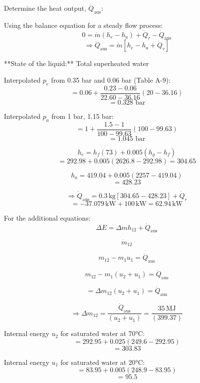Determine the heat output, $\dot{Q}_{\text{aus}}$:

Using the balance equation for a steady flow process:
\[
0 = \dot{m} (h_e - h_a) + \dot{Q}_r - \dot{Q}_{\text{aus}}
\]
\[
\Rightarrow \dot{Q}_{\text{aus}} = \dot{m} [h_e - h_a + \dot{Q}_r]
\]

**State of the liquid:** Total superheated water

Interpolated $p_e$ from 0.35 bar and 0.06 bar (Table A-9):
\[
= 0.06 + \frac{0.23 - 0.06}{22.60 - 36.16} (20 - 36.16)
\]
\[
= 0.328 \text{ bar}
\]

Interpolated $p_a$ from 1 bar, 1.15 bar:
\[
= 1 + \frac{1.5 - 1}{100 - 99.63} (100 - 99.63)
\]
\[
= 1.045 \text{ bar}
\]

\[
h_e = h_f (73) + 0.005 (h_{g} - h_{f})
\]
\[
= 292.98 + 0.005 (2626.8 - 292.98) = 304.65
\]

\[
h_a = 419.04 + 0.005 (2257 - 419.04)
\]
\[
= 428.23
\]

\[
\Rightarrow \dot{Q}_{\text{aus}} = 0.3 \, \text{kg} \left[ 304.65 - 428.23 \right] + \dot{Q}_r
\]
\[
= -37.079 \, \text{kW} + 100 \, \text{kW} = 62.94 \, \text{kW}
\]

For the additional equations:
\[
\Delta E = \Delta m h_{12} + \dot{Q}_{\text{aus}}
\]

\[
\dot{m}_{12}
\]

\[
m_{12} - m_{1} u_{1} = \dot{Q}_{\text{aus}}
\]

\[
m_{12} - m_{1} (u_{2} + u_{1}) = \dot{Q}_{\text{aus}}
\]

\[
= \Delta m_{12} (u_{2} + u_{1}) = \dot{Q}_{\text{aus}}
\]

\[
\Rightarrow \Delta m_{12} = \frac{\dot{Q}_{\text{aus}}}{(u_{2} + u_{1})} = \frac{35 \, \text{MJ}}{(399.37)}
\]

Internal energy $u_2$ for saturated water at 70°C:
\[
= 292.95 + 0.025 (249.6 - 292.95)
\]
\[
= 303.83
\]

Internal energy $u_1$ for saturated water at 20°C:
\[
= 83.95 + 0.005 (248.9 - 83.95)
\]
\[
= 95.5
\]